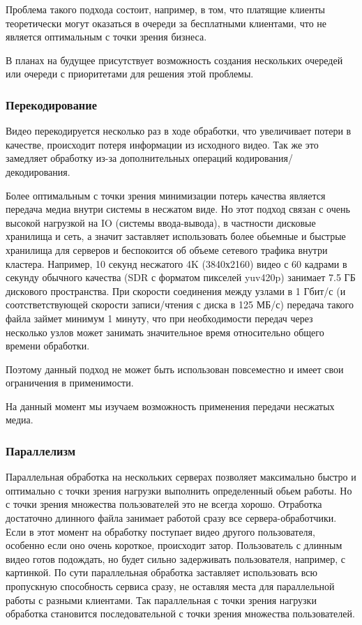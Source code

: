 Проблема такого подхода состоит, например, в том, что платящие клиенты теоретически могут оказаться в очереди за бесплатными клиентами, что не является оптимальным с точки зрения бизнеса.

В планах на будущее присутствует возможность создания нескольких очередей или очереди с приоритетами для решения этой проблемы.

\subsubsection{Перекодирование}

Видео перекодируется несколько раз в ходе обработки, что увеличивает потери в качестве, происходит потеря информации из исходного видео. Так же это замедляет обработку из-за дополнительных операций кодирования/декодирования.

Более оптимальным с точки зрения минимизации потерь качества является передача медиа внутри системы в несжатом виде.
Но этот подход связан с очень высокой нагрузкой на IO (системы ввода-вывода), в частности дисковые хранилища и сеть, а значит заставляет использовать более обьемные и быстрые хранилища для серверов и беспокоится об объеме сетевого трафика внутри кластера.
Например, 10 секунд несжатого 4K (3840х2160) видео с 60 кадрами в секунду обычного качества (SDR с форматом пикселей yuv420p) занимает 7.5 ГБ дискового пространства.
При скорости соединения между узлами в 1 Гбит/с (и соотстветствующей скорости записи/чтения с диска в 125 МБ/с) передача такого файла займет минимум 1 минуту, что при необходимости передач через несколько узлов может занимать значительное время относительно общего времени обработки.

Поэтому данный подход не может быть использован повсеместно и имеет свои ограничения в применимости.

На данный момент мы изучаем возможность применения передачи несжатых медиа.

\subsubsection{Параллелизм}

Параллельная обработка на нескольких серверах позволяет максимально быстро и оптимально с точки зрения нагрузки выполнить определенный обьем работы. Но с точки зрения множества пользователей это не всегда хорошо. Отработка достаточно длинного файла занимает работой сразу все сервера-обработчики. Если в этот момент на обработку поступает видео другого пользователя, особенно если оно очень короткое, происходит затор. Пользователь с длинным видео готов подождать, но будет сильно задерживать пользователя, например, с картинкой. По сути параллельная обработка заставляет использовать всю пропускную способность сервиса сразу, не оставляя места для параллельной работы с разными клиентами. Так параллельная с точки зрения нагрузки обработка становится последовательной с точки зрения множества пользователей.

